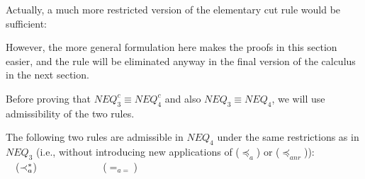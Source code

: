 \begin{REMARK}\label{re:cutx}
Actually, a much more restricted
version of the elementary cut rule would be sufficient: 
\begin{center}  \end{center}
However, the more general formulation here makes
the proofs in this section easier, and the rule will be eliminated anyway in the
final version of the calculus in the next section.
\end{REMARK}
\noindent
Before proving that $NEQ_3^c \equiv NEQ_4^c$ and also $NEQ_3\equiv
NEQ_4$, we will use admissibility of the two rules.
\begin{LEMMA}\label{le:asinNEQ3}
The following two rules are admissible in $NEQ_4$ under the same restrictions
as in $NEQ_3$ (i.e., without introducing new applications of ($\preceq_a$) or
($\preceq_{anr}$)): \\[1ex]
\hspace*{3em}
\ \ ($\mathbin{\prec}_a^*$) 
\ \ \ \ \ \ \ \ \ \ \ \ 
 ($=_{a=}$) \\[3ex]
\end{LEMMA}
